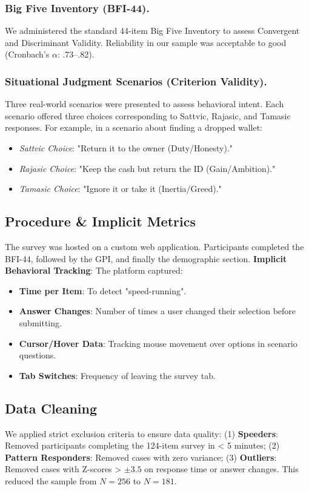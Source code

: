 \documentclass[runningheads]{llncs}
\begin{document}
\subsubsection{Big Five Inventory (BFI-44).}
We administered the standard 44-item Big Five Inventory \cite{benet1998} to assess Convergent and Discriminant Validity. Reliability in our sample was acceptable to good (Cronbach's $\alpha$: .73--.82).

\subsubsection{Situational Judgment Scenarios (Criterion Validity).}
Three real-world scenarios were presented to assess behavioral intent. Each scenario offered three choices corresponding to Sattvic, Rajasic, and Tamasic responses. For example, in a scenario about finding a dropped wallet:
\begin{itemize}
    \item \textit{Sattvic Choice}: "Return it to the owner (Duty/Honesty)."
    \item \textit{Rajasic Choice}: "Keep the cash but return the ID (Gain/Ambition)."
    \item \textit{Tamasic Choice}: "Ignore it or take it (Inertia/Greed)."
\end{itemize}

\subsection{Procedure \& Implicit Metrics}
The survey was hosted on a custom web application. Participants completed the BFI-44, followed by the GPI, and finally the demographic section.
\textbf{Implicit Behavioral Tracking}: The platform captured:
\begin{itemize}
    \item \textbf{Time per Item}: To detect "speed-running".
    \item \textbf{Answer Changes}: Number of times a user changed their selection before submitting.
    \item \textbf{Cursor/Hover Data}: Tracking mouse movement over options in scenario questions.
    \item \textbf{Tab Switches}: Frequency of leaving the survey tab.
\end{itemize}

\subsection{Data Cleaning}
We applied strict exclusion criteria to ensure data quality: (1) \textbf{Speeders}: Removed participants completing the 124-item survey in < 5 minutes; (2) \textbf{Pattern Responders}: Removed cases with zero variance; (3) \textbf{Outliers}: Removed cases with Z-scores > $\pm 3.5$ on response time or answer changes. This reduced the sample from $N=256$ to $N=181$.
\end{document}
